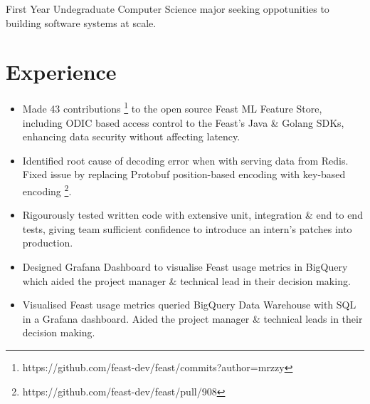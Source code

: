 %
%


\fancyhead{} %


First Year Undegraduate Computer Science major seeking oppotunities to building software systems at scale.

\section{Experience}
\begin{itemize}
  \item Made 43 contributions \footnote{https://github.com/feast-dev/feast/commits?author=mrzzy} 
    to the open source Feast ML Feature Store, including ODIC based access control to the Feast's Java 
    \& Golang SDKs, enhancing data security without affecting latency.

  \item Identified root cause of decoding error when with serving data from Redis.
    Fixed issue by replacing Protobuf position-based encoding with key-based encoding
    \footnote{https://github.com/feast-dev/feast/pull/908}.

  \item Rigourously tested written code with extensive unit, integration \& end to end tests,
    giving team sufficient confidence to introduce an intern's patches into production.

  \item Designed Grafana Dashboard to visualise Feast usage metrics in BigQuery which aided the project manager \& technical lead in their decision making.

  \item Visualised Feast usage metrics queried BigQuery Data Warehouse with SQL 
    in a Grafana dashboard. Aided the project manager \& technical leads in their decision making.
\end{itemize}

